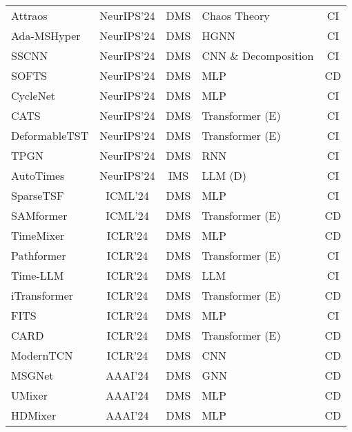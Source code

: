 \documentclass[a4paper,oneside,bibliography=totoc]{scrbook}
\begin{document}
{\begin{longtable}{@{}
    >{\raggedright}p{5.5cm}
    c
    c
    >{\centering\arraybackslash}p{2.8cm}
    c}
        Attraos \cite{hu_attractor_2024} & NeurIPS'24 & DMS  & Chaos Theory \cite{devaney_introduction_2018} & CI\\
        Ada-MSHyper \cite{shang_ada-mshyper_2024}           & NeurIPS'24 & DMS  & HGNN \cite{feng_hypergraph_2019} & CI\\
        SSCNN \cite{deng_parsimony_2024} & NeurIPS'24 & DMS  & CNN \& Decomposition & CI\\
        SOFTS \cite{han_softs_2024} & NeurIPS'24 & DMS  & MLP & CD\\
        CycleNet \cite{deng_parsimony_2024} & NeurIPS'24 & DMS  & MLP & CI\\
        CATS \cite{kim_are_2024}           & NeurIPS'24 & DMS  & Transformer (E) & CI\\
        DeformableTST \cite{luo_deformabletst_2024} & NeurIPS'24 & DMS  & Transformer (E) & CI\\
        TPGN \cite{liu_autotimes_2024} & NeurIPS'24 & DMS  & RNN & CI\\
        AutoTimes \cite{liu_autotimes_2024} & NeurIPS'24 & IMS  & LLM (D) & CI\\
        SparseTSF \cite{lin_sparsetsf_2024}      & ICML'24           & DMS  & MLP & CI\\
        SAMformer \cite{ilbert_samformer_2024} & ICML'24 & DMS & Transformer (E) & CD\\
        TimeMixer \cite{chen_pathformer_2023} & ICLR'24 & DMS & MLP & CD \\
        Pathformer \cite{chen_pathformer_2023} & ICLR'24 & DMS & Transformer (E) & CI \\
        Time-LLM   \cite{jin_time-llm_2023}  & ICLR'24    & DMS  & LLM & CI\\
        iTransformer \cite{liu_itransformer_2023}    & ICLR'24    & DMS  & Transformer (E) & CD\\
        FITS \cite{xu_fits_2023} & ICLR'24 & DMS & MLP & CI \\
        CARD \cite{wang_card_2023} & ICLR'24 & DMS & Transformer (E) & CD \\
        ModernTCN \cite{donghao_moderntcn_2023}     & ICLR'24   & DMS  & CNN & CD\\
        MSGNet \cite{cai_msgnet_2024} & AAAI'24 & DMS  & GNN & CD\\
        UMixer \cite{ma_u-mixer_2024}         & AAAI'24    & DMS  & MLP & CD\\
        HDMixer \cite{huang_hdmixer_2024}      & AAAI'24           & DMS  & MLP & CD\\

\end{longtable}}
\end{document}
